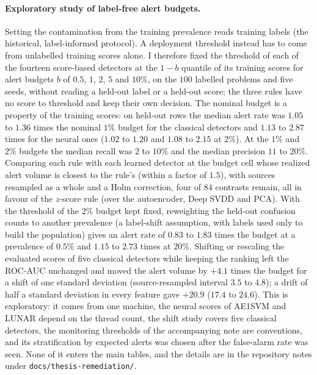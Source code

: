 \documentclass[conference]{IEEEtran}
\begin{document}
\paragraph{Exploratory study of label-free alert budgets.} Setting the contamination from the
training prevalence reads training labels (the historical, label-informed protocol). A deployment
threshold instead has to come from unlabelled training scores alone. I therefore fixed the threshold of
each of the fourteen score-based detectors at the $1-b$ quantile of its training scores for alert budgets
$b$ of $0.5$, $1$, $2$, $5$ and $10\%$, on the $100$ labelled problems and five seeds, without
reading a held-out label or a held-out score; the three rules have no score to threshold and keep
their own decision. The nominal budget is a property of the training scores: on held-out rows the median
alert rate was $1.05$ to $1.36$ times the nominal $1\%$ budget for the classical detectors and $1.13$ to $2.87$
times for the neural ones ($1.02$ to $1.20$ and $1.08$ to $2.15$ at $2\%$). At the $1\%$ and $2\%$ budgets the
median recall was $2$ to $10\%$ and the median precision $11$ to $20\%$. Comparing each rule with each learned
detector at the budget cell whose realized alert volume is closest to the rule's (within a factor of $1.5$),
with sources resampled as a whole and a Holm correction, four of $84$ contrasts remain, all in favour of the
$z$-score rule (over the autoencoder, Deep SVDD and PCA). With the threshold of the $2\%$ budget kept fixed,
reweighting the held-out confusion counts to another prevalence (a label-shift assumption, with labels used
only to build the population) gives an alert rate of $0.83$ to $1.83$ times the budget at a prevalence of
$0.5\%$ and $1.15$ to $2.73$ times at $20\%$. Shifting or rescaling the evaluated scores of five classical
detectors while keeping the ranking left the ROC-AUC unchanged and moved the alert volume by $+4.1$ times
the budget for a shift of one standard deviation (source-resampled interval $3.5$ to $4.8$); a drift of half
a standard deviation in every feature gave $+20.9$ ($17.4$ to $24.6$). This is exploratory: it comes from one
machine, the neural scores of AE1SVM and LUNAR depend on the thread count, the shift study covers five
classical detectors, the monitoring thresholds of the accompanying note are conventions, and its
stratification by expected alerts was chosen after the false-alarm rate was seen. None of it enters the main
tables, and the details are in the repository notes under \texttt{docs/thesis-remediation/}.
\end{document}
